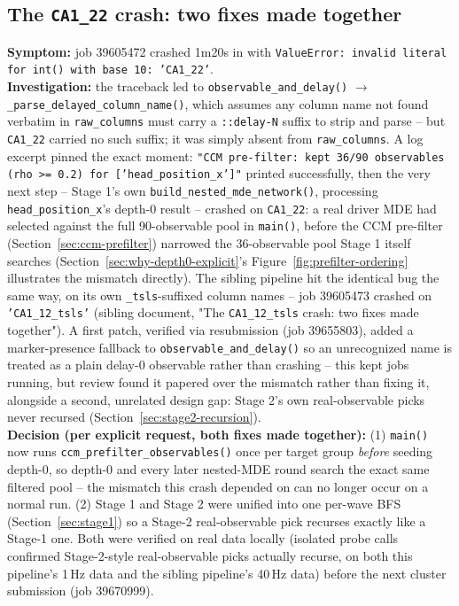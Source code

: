 \documentclass[11pt]{article}
\begin{document}
\subsection{The \texttt{CA1\_22} crash: two fixes made together}
\label{sec:history-prefilter-order}
\textbf{Symptom:} job 39605472 crashed 1m20s in with \texttt{ValueError: invalid literal for int() with base 10: 'CA1\_22'}.\\
\textbf{Investigation:} the traceback led to \texttt{observable\_and\_delay()} $\to$ \texttt{\_parse\_delayed\_column\_name()}, which assumes any column name not found verbatim in \texttt{raw\_columns} must carry a \texttt{::delay-N} suffix to strip and parse -- but \texttt{CA1\_22} carried no such suffix; it was simply absent from \texttt{raw\_columns}. A log excerpt pinned the exact moment: \texttt{"CCM pre-filter: kept 36/90 observables (rho >= 0.2) for ['head\_position\_x']"} printed successfully, then the very next step -- Stage 1's own \texttt{build\_nested\_mde\_network()}, processing \texttt{head\_position\_x}'s depth-0 result -- crashed on \texttt{CA1\_22}: a real driver MDE had selected against the full 90-observable pool in \texttt{main()}, before the CCM pre-filter (Section~\ref{sec:ccm-prefilter}) narrowed the 36-observable pool Stage 1 itself searches (Section~\ref{sec:why-depth0-explicit}'s Figure~\ref{fig:prefilter-ordering} illustrates the mismatch directly). The sibling pipeline hit the identical bug the same way, on its own \texttt{\_tsls}-suffixed column names -- job 39605473 crashed on \texttt{'CA1\_12\_tsls'} (sibling document, "The \texttt{CA1\_12\_tsls} crash: two fixes made together"). A first patch, verified via resubmission (job 39655803), added a marker-presence fallback to \texttt{observable\_and\_delay()} so an unrecognized name is treated as a plain delay-0 observable rather than crashing -- this kept jobs running, but review found it papered over the mismatch rather than fixing it, alongside a second, unrelated design gap: Stage 2's own real-observable picks never recursed (Section~\ref{sec:stage2-recursion}).\\
\textbf{Decision (per explicit request, both fixes made together):} (1) \texttt{main()} now runs \texttt{ccm\_prefilter\_observables()} once per target group \emph{before} seeding depth-0, so depth-0 and every later nested-MDE round search the exact same filtered pool -- the mismatch this crash depended on can no longer occur on a normal run. (2) Stage 1 and Stage 2 were unified into one per-wave BFS (Section~\ref{sec:stage1}) so a Stage-2 real-observable pick recurses exactly like a Stage-1 one. Both were verified on real data locally (isolated probe calls confirmed Stage-2-style real-observable picks actually recurse, on both this pipeline's 1\,Hz data and the sibling pipeline's 40\,Hz data) before the next cluster submission (job 39670999).\\
\end{document}
